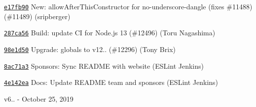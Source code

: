 \begin{DoxyItemize}
\item \href{https://github.com/eslint/eslint/commit/e17fb90f5817d16081e690eb06b7720afcb9fa2a}{\texttt{ {\ttfamily e17fb90}}} New\+: allow\+After\+This\+Constructor for no-\/underscore-\/dangle (fixes \#11488) (\#11489) (sripberger)
\item \href{https://github.com/eslint/eslint/commit/287ca562811d037bde09a47af7f5b9c7b741e022}{\texttt{ {\ttfamily 287ca56}}} Build\+: update CI for Node.\+js 13 (\#12496) (Toru Nagashima)
\item \href{https://github.com/eslint/eslint/commit/98e1d50273f31c2a7b59772298280ed7305274c8}{\texttt{ {\ttfamily 98e1d50}}} Upgrade\+: globals to v12.. (\#12296) (Tony Brix)
\item \href{https://github.com/eslint/eslint/commit/8ac71a3c89a9db13706a44b23d1b509b65185113}{\texttt{ {\ttfamily 8ac71a3}}} Sponsors\+: Sync R\+E\+A\+D\+ME with website (E\+S\+Lint Jenkins)
\item \href{https://github.com/eslint/eslint/commit/4e142ea411dfb692b6e2a69cd5f1204ade4dd58a}{\texttt{ {\ttfamily 4e142ea}}} Docs\+: Update R\+E\+A\+D\+ME team and sponsors (E\+S\+Lint Jenkins)
\end{DoxyItemize}

v6.. -\/ October 25, 2019


